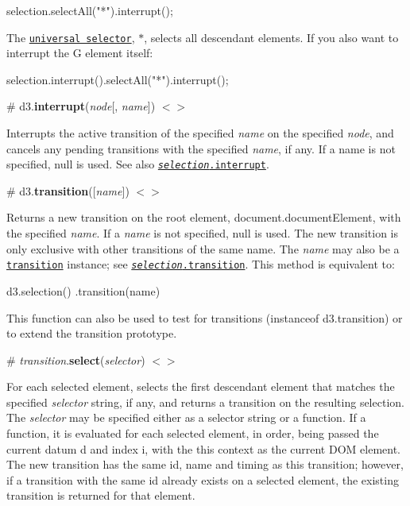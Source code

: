 \begin{DoxyCode}
selection.selectAll("*").interrupt();
\end{DoxyCode}


The \href{https://developer.mozilla.org/en-US/docs/Web/CSS/Universal_selectors}{\tt universal selector}, {\ttfamily $\ast$}, selects all descendant elements. If you also want to interrupt the G element itself\+:


\begin{DoxyCode}
selection.interrupt().selectAll("*").interrupt();
\end{DoxyCode}


\label{_interrupt}%
\# d3.{\bfseries interrupt}({\itshape node}\mbox{[}, {\itshape name}\mbox{]}) \href{https://github.com/d3/d3-transition/blob/master/src/interrupt.js}{\tt $<$$>$}

Interrupts the active transition of the specified {\itshape name} on the specified {\itshape node}, and cancels any pending transitions with the specified {\itshape name}, if any. If a name is not specified, null is used. See also \href{#selection_interrupt}{\tt {\itshape selection}.interrupt}.

\label{_transition}%
\# d3.{\bfseries transition}(\mbox{[}{\itshape name}\mbox{]}) \href{https://github.com/d3/d3-transition/blob/master/src/transition/index.js#L29}{\tt $<$$>$}

Returns a new transition on the root element, {\ttfamily document.\+document\+Element}, with the specified {\itshape name}. If a {\itshape name} is not specified, null is used. The new transition is only exclusive with other transitions of the same name. The {\itshape name} may also be a \href{#transition}{\tt transition} instance; see \href{#selection_transition}{\tt {\itshape selection}.transition}. This method is equivalent to\+:


\begin{DoxyCode}
d3.selection()
  .transition(name)
\end{DoxyCode}


This function can also be used to test for transitions ({\ttfamily instanceof d3.\+transition}) or to extend the transition prototype.

\label{_transition_select}%
\# {\itshape transition}.{\bfseries select}({\itshape selector}) \href{https://github.com/d3/d3-transition/blob/master/src/transition/select.js}{\tt $<$$>$}

For each selected element, selects the first descendant element that matches the specified {\itshape selector} string, if any, and returns a transition on the resulting selection. The {\itshape selector} may be specified either as a selector string or a function. If a function, it is evaluated for each selected element, in order, being passed the current datum {\ttfamily d} and index {\ttfamily i}, with the {\ttfamily this} context as the current D\+OM element. The new transition has the same id, name and timing as this transition; however, if a transition with the same id already exists on a selected element, the existing transition is returned for that element.

